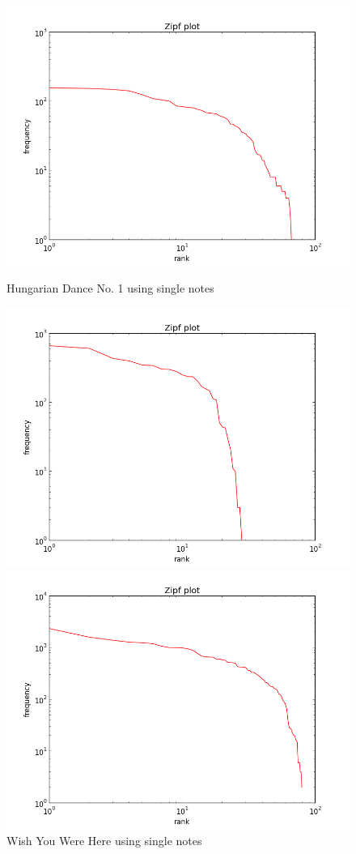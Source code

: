 \documentclass[10pt]{book}
\begin{document}
\begin{figure}[!htb]
  \includegraphics[width=\linewidth]{hungdan_notes_1}
  \caption{Hungarian Dance No. 1 using single notes}\label{fig:hungdan_notes_1}
\endminipage\hfill
{}
  \includegraphics[width=\linewidth]{wish_notes_1}
  \caption{Wish You Were Here using single notes}\label{fig:wish_notes_1}
\endminipage\hfill
{}%
  \includegraphics[width=\linewidth]{rach_notes_1}

\end{figure}
\end{document}
